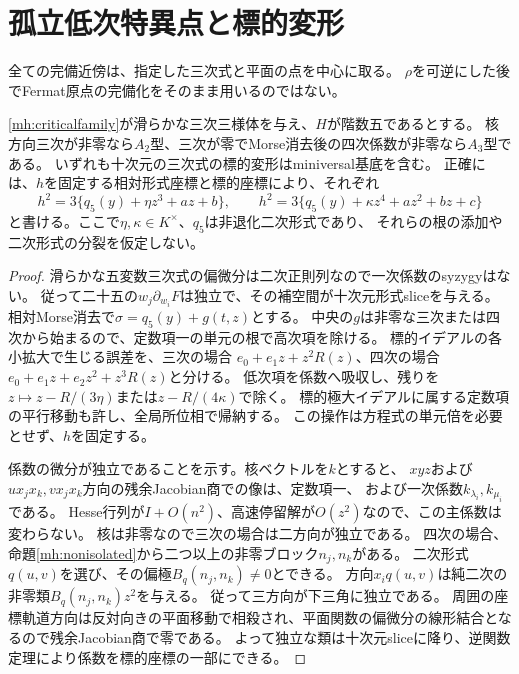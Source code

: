 \section{孤立低次特異点と標的変形}
全ての完備近傍は、指定した三次式と平面の点を中心に取る。
$\rho$を可逆にした後でFermat原点の完備化をそのまま用いるのではない。
\begin{theorem}\label{mh:versal}
\eqref{mh:criticalfamily}が滑らかな三次三様体を与え、$H$が階数五であるとする。
核方向三次が非零なら$A_2$型、三次が零でMorse消去後の四次係数が非零なら$A_3$型である。
いずれも十次元の三次式の標的変形はminiversal基底を含む。
正確には、$h$を固定する相対形式座標と標的座標により、それぞれ
\[
 h^2=3\{q_5(y)+\eta z^3+az+b\},\qquad
 h^2=3\{q_5(y)+\kappa z^4+az^2+bz+c\}
\]
と書ける。ここで$\eta,\kappa\in K^\times$、$q_5$は非退化二次形式であり、
それらの根の添加や二次形式の分裂を仮定しない。
\end{theorem}
\begin{proof}
滑らかな五変数三次式の偏微分は二次正則列なので一次係数のsyzygyはない。
従って二十五の$w_j\partial_{w_i}F$は独立で、その補空間が十次元形式sliceを与える。
相対Morse消去で$\sigma=q_5(y)+g(t,z)$とする。
中央の$g$は非零な三次または四次から始まるので、定数項一の単元の根で高次項を除ける。
標的イデアルの各小拡大で生じる誤差を、三次の場合
$e_0+e_1z+z^2R(z)$、四次の場合$e_0+e_1z+e_2z^2+z^3R(z)$と分ける。
低次項を係数へ吸収し、残りを$z\mapsto z-R/(3\eta)$または$z-R/(4\kappa)$で除く。
標的極大イデアルに属する定数項の平行移動も許し、全局所位相で帰納する。
この操作は方程式の単元倍を必要とせず、$h$を固定する。

係数の微分が独立であることを示す。核ベクトルを$k$とすると、
$xyz$および$ux_jx_k,vx_jx_k$方向の残余Jacobian商での像は、定数項一、
および一次係数$k_{\lambda_i},k_{\mu_i}$である。
Hesse行列が$I+O(n^2)$、高速停留解が$O(z^2)$なので、この主係数は変わらない。
核は非零なので三次の場合は二方向が独立である。
四次の場合、命題\ref{mh:nonisolated}から二つ以上の非零ブロック$n_j,n_k$がある。
二次形式$q(u,v)$を選び、その偏極$B_q(n_j,n_k)\ne0$とできる。
方向$x_iq(u,v)$は純二次の非零類$B_q(n_j,n_k)z^2$を与える。
従って三方向が下三角に独立である。
周囲の座標軌道方向は反対向きの平面移動で相殺され、平面関数の偏微分の線形結合となるので残余Jacobian商で零である。
よって独立な類は十次元sliceに降り、逆関数定理により係数を標的座標の一部にできる。
\end{proof}

